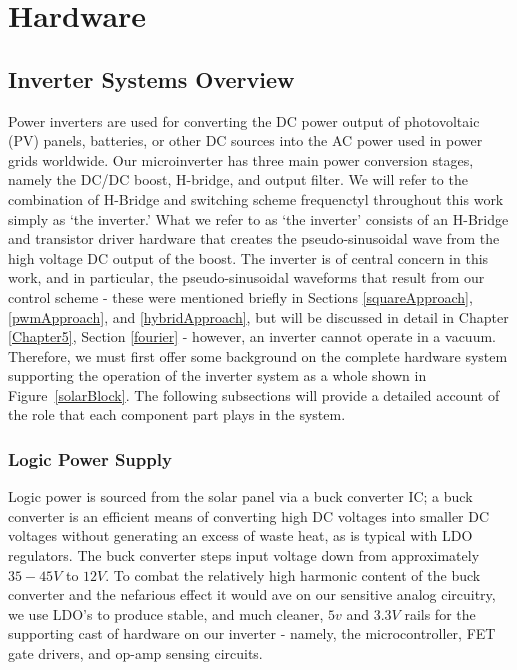 
\chapter{Hardware} %

\label{hardware} %



\section{Inverter Systems Overview}

Power inverters are used for converting the DC power output of photovoltaic (PV) panels, batteries, or other DC sources into the AC power used in power grids worldwide. Our microinverter has three main power conversion stages, namely the DC/DC boost, H-bridge, and output filter. We will refer to the combination of H-Bridge and switching scheme frequenctyl throughout this work simply as `the inverter.'  What we refer to as `the inverter' consists of an H-Bridge and transistor driver hardware that creates the pseudo-sinusoidal wave from the high voltage DC output of the boost. The inverter is of central concern in this work, and in particular, the pseudo-sinusoidal waveforms that result from our control scheme - these were mentioned briefly in Sections \ref{squareApproach}, \ref{pwmApproach}, and \ref{hybridApproach}, but will be discussed in detail in Chapter \ref{Chapter5}, Section \ref{fourier} - however, an inverter cannot operate in a vacuum. Therefore, we must first offer some background on the complete hardware system supporting the operation of the inverter system as a whole shown in Figure~\ref{solarBlock}. The following subsections will provide a detailed account of the role that each component part plays in the system.

\subsection{Logic Power Supply}

Logic power is sourced from the solar panel via a buck converter IC; a buck converter is an efficient means of converting high DC voltages into smaller DC voltages without generating an excess of waste heat, as is typical with LDO regulators. The buck converter steps input voltage down from approximately $35-45V$ to $12V$. To combat the relatively high harmonic content of the buck converter and the nefarious effect it would ave on our sensitive analog circuitry, we use LDO's to produce stable, and much cleaner, $5v$ and $3.3V$ rails for the supporting cast of hardware on our inverter - namely, the microcontroller, FET gate drivers, and op-amp sensing circuits. 

